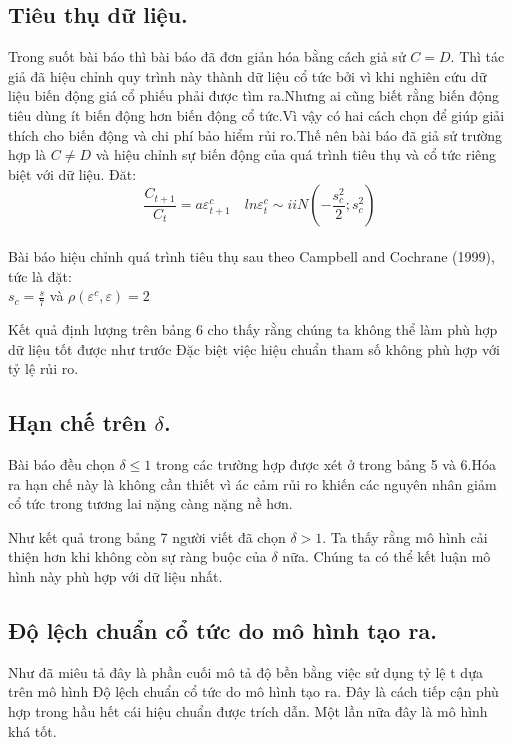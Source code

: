 \documentclass[10pt,a4paper]{article}
\begin{document}
\subsection{Tiêu thụ dữ liệu.}
Trong suốt bài báo thì bài báo đã đơn giản hóa bằng cách giả sử $C=D$. Thì tác giả đã hiệu chỉnh quy trình này thành dữ liệu cổ tức bởi vì khi nghiên cứu dữ liệu biến động giá cổ phiếu phải được tìm ra.Nhưng ai cũng biết rằng biến động tiêu dùng ít biến động hơn biến động cổ tức.Vì vậy có hai cách chọn để giúp giải thích cho biến động và chi phí bảo hiểm rủi ro.Thế nên bài báo đã giả sử trường hợp là $C \ne D$ và hiệu chỉnh sự biến động của quá trình tiêu thụ và cổ tức riêng biệt với dữ liệu. Đăt:\\
$$\frac{C_{t+1}}{C_t}=a \varepsilon_{t+1}^{c} \quad ln\varepsilon_{t}^{c} \sim iiN(-\frac{s_{c}^2}{2};s_{c}^{2})$$\\
Bài báo hiệu chỉnh quá trình tiêu thụ sau theo  Campbell and Cochrane (1999), tức là đặt:\\
$s_c=\frac{s}{7}$ và $\rho(\varepsilon^c,\varepsilon)=2$\\

\begin{figure}[!h]
	\centering
\end{figure}

Kết quả định lượng trên bảng 6 cho thấy rằng chúng ta không thể làm phù hợp dữ liệu tốt được như trước  Đặc biệt việc hiệu chuẩn tham số không phù hợp với tỷ lệ rủi ro.
\subsection{Hạn chế trên $\delta$.}
Bài báo đều chọn $\delta \leq 1$ trong các trường hợp được xét ở trong bảng 5 và 6.Hóa ra hạn chế này là không cần thiết vì ác cảm rủi ro khiến các nguyên nhân giảm cổ tức trong tương lai nặng càng nặng nề hơn.\\
\begin{figure}[!h]
	\centering
\end{figure}
Như kết quả trong bảng 7 người viết đã chọn $\delta > 1$. Ta thấy rằng mô hình cải thiện hơn khi không còn sự ràng buộc của $\delta$ nữa. Chúng ta có thể kết luận mô hình này phù hợp với dữ liệu nhất.
\subsection{Độ lệch chuẩn cổ tức do mô hình tạo ra.}
Như đã miêu tả đây là phần cuối mô tả độ bền bằng việc sử dụng tỷ lệ t dựa trên mô hình Độ lệch chuẩn cổ tức do mô hình tạo ra. Đây là cách tiếp cận phù hợp trong hầu hết cái hiệu chuẩn được trích dẫn. Một lần nữa đây là mô hình khá tốt.
\end{document}
